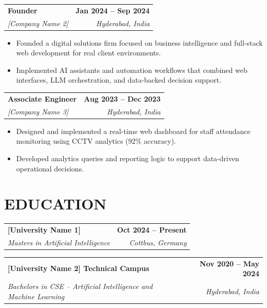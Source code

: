 \documentclass[a4paper,11pt]{article}
\makeatletter
\newcommand{\entryheader}[4]{%
  \begin{tabularx}{\textwidth}{@{}>{\RaggedRight\arraybackslash}X r@{}}
    \textbf{#1} & \textbf{#2} \\
    \textit{#3} & \textit{#4} \\
  \end{tabularx}%
}
\newenvironment{entrybullets}{%
  \begin{minipage}[t]{0.77\textwidth}
    \begin{itemize}[leftmargin=*,label=\textbullet,align=left]
}{%
    \end{itemize}
  \end{minipage}
}
\makeatother
\begin{document}
\vspace{0.25cm}
\entryheader{Founder}{Jan 2024 -- Sep 2024}{[Company Name 2]}{Hyderabad, India}
\begin{entrybullets}
  \item Founded a digital solutions firm focused on business intelligence and full-stack web development for real client environments.
  \item Implemented AI assistants and automation workflows that combined web interfaces, LLM orchestration, and data-backed decision support.
\end{entrybullets}

\vspace{0.25cm}
\entryheader{Associate Engineer}{Aug 2023 -- Dec 2023}{[Company Name 3]}{Hyderabad, India}
\begin{entrybullets}
  \item Designed and implemented a real-time web dashboard for staff attendance monitoring using CCTV analytics (92\% accuracy).
  \item Developed analytics queries and reporting logic to support data-driven operational decisions.
\end{entrybullets}

\section*{EDUCATION}
\begin{tabularx}{\textwidth}{@{}X r@{}}
  \textbf{[University Name 1]} & \textbf{Oct 2024 -- Present} \\
  \textit{Masters in Artificial Intelligence} & \textit{Cottbus, Germany} \\
\end{tabularx}

\vspace{0.25cm}
\begin{tabularx}{\textwidth}{@{}X r@{}}
  \textbf{[University Name 2] Technical Campus} & \textbf{Nov 2020 -- May 2024} \\
  \textit{Bachelors in CSE -- Artificial Intelligence and Machine Learning} & \textit{Hyderabad, India} \\
\end{tabularx}
\end{document}
